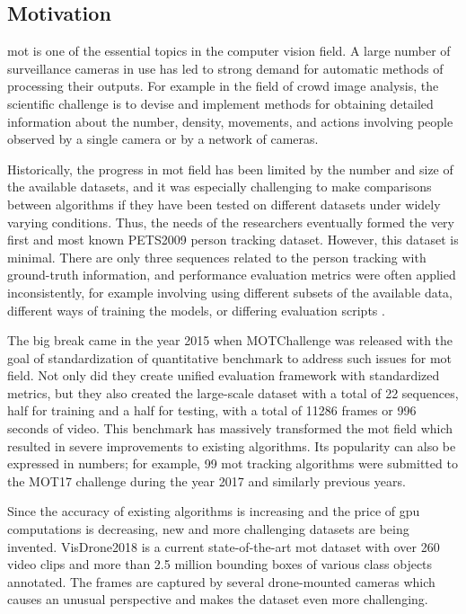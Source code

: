 \begin{introduction}
    \section{Motivation}
        \gls{mot} is one of the essential topics in the computer vision field. A large number of surveillance cameras in use has led to strong demand for automatic methods of processing their outputs. For example in the field of crowd image analysis, the scientific challenge is to devise and implement methods for obtaining detailed information about the number, density, movements, and actions involving people observed by a single camera or by a network of cameras.  
        
        Historically, the progress in \gls{mot} field has been limited by the number and size of the available datasets, and it was especially challenging to make comparisons between algorithms if they have been tested on different datasets under widely varying conditions. Thus, the needs of the researchers eventually formed the very first and most known PETS2009 \cite{ferryman2009pets2009} person tracking dataset. However, this dataset is minimal. There are only three sequences related to the person tracking with ground-truth information, and performance evaluation metrics were often applied inconsistently, for example involving using different subsets of the available data, different ways of training the models, or differing evaluation scripts \cite{mot15}.
        
        The big break came in the year 2015 when MOTChallenge \cite{MOTChallenge2015} was released with the goal of standardization of quantitative benchmark to address such issues for \gls{mot} field. Not only did they create unified evaluation framework with standardized metrics, but they also created the large-scale dataset with a total of 22 sequences, half for training and a half for testing, with a total of 11286 frames or 996 seconds of video. This benchmark has massively transformed the \gls{mot} field which resulted in severe improvements to existing algorithms. Its popularity can also be expressed in numbers; for example, 99 \gls{mot} tracking algorithms were submitted to the MOT17 challenge \cite{mot16} during the year 2017 and similarly previous years. 
        
        Since the accuracy of existing algorithms is increasing and the price of \gls{gpu} computations is decreasing, new and more challenging datasets are being invented. VisDrone2018 \cite{zhuvisdrone2018} is a current state-of-the-art \gls{mot} dataset with over 260 video clips and more than 2.5 million bounding boxes of various class objects annotated. The frames are captured by several drone-mounted cameras which causes an unusual perspective and makes the dataset even more challenging. 
        

\end{introduction}

